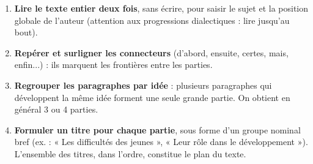 \documentclass[11pt]{article}
\begin{document}
\begin{methode}
\begin{enumerate}
\item \textbf{Lire le texte entier deux fois}, sans écrire, pour saisir le sujet et la position globale de l'auteur (attention aux progressions dialectiques : lire jusqu'au bout).
\item \textbf{Repérer et surligner les connecteurs} (d'abord, ensuite, certes, mais, enfin...) : ils marquent les frontières entre les parties.
\item \textbf{Regrouper les paragraphes par idée} : plusieurs paragraphes qui développent la même idée forment une seule grande partie. On obtient en général 3 ou 4 parties.
\item \textbf{Formuler un titre pour chaque partie}, sous forme d'un groupe nominal bref (ex. : « Les difficultés des jeunes », « Leur rôle dans le développement »). L'ensemble des titres, dans l'ordre, constitue le plan du texte.
\end{enumerate}
\end{methode}
\end{document}

